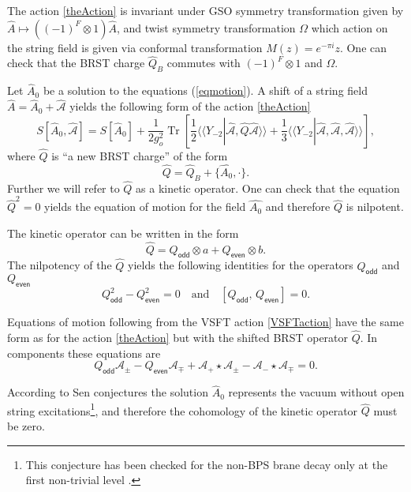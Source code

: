 \documentclass[a4paper,12pt]{article}
\newcommand{\ra}{\rightarrow}
\newcommand{\Ac}{\mathcal{A}}
\newcommand{\Tr}{\mathop{\mathrm{Tr}}\nolimits}
\newcommand{\la}{\langle\!\langle}
\renewcommand{\ra}{\rangle\!\rangle}
\begin{document}
The action \eqref{theAction} is invariant under GSO symmetry transformation given by
$\hat{A}\mapsto ((-1)^F\otimes 1)\hat{A}$,
and twist symmetry transformation $\Omega$ which action on the string field
is given via conformal transformation $M(z)=e^{-\pi i}z$.
One can check that the BRST charge $\hat{Q}_B$ commutes with $(-1)^F\otimes 1$
and $\Omega$.

Let $\hat{A}_{0}$ be a solution to the equations (\ref{eqmotion}).
A shift of a string field $
\hat{A}=\hat{A}_0+\hat{\Ac}
$ yields the following form of the action
\eqref{theAction}
\begin{equation}
S[\hat{A}_0,\hat{\Ac}]=S[\hat{A}_0]+\frac{1}{2g_o^2}\Tr\left[\frac{1}{2}\la Y_{-2}|\hat{\Ac}, \hat{Q}\hat{\Ac}\ra
+\frac13\la Y_{-2}|\hat{\Ac},\hat{\Ac}, \hat{\Ac}\ra\right],
\label{VSFTaction}
\end{equation}
where $\hat{Q}$ is ``a new BRST charge'' of the form
\begin{equation}
\hat{Q}=\hat{Q}_B+\{\hat{A_0},\cdot\}.
\label{shift:BRST}
\end{equation}
Further we will refer to $\hat{Q}$ as a kinetic operator.
One can check that the equation $\hat{Q}^2=0$
yields the equation of motion for the field $\hat{A_{0}}$ and
therefore $\hat{Q}$ is nilpotent.

The kinetic operator can be written in the form
\begin{equation}
\hat{Q}=Q_{\textsf{odd}}\otimes a+Q_{\textsf{even}}\otimes b.
\label{abg:100}
\end{equation}
The nilpotency of the $\hat{Q}$
yields the following identities for the operators $Q_{\textsf{odd}}$
and $Q_{\textsf{even}}$
\begin{equation}
Q_{\textsf{odd}}^2-Q_{\textsf{even}}^2=0\quad\text{and}\quad
[Q_{\textsf{odd}},\,Q_{\textsf{even}}]=0.
\label{eqBRST}
\end{equation}

Equations of motion following from the VSFT action \eqref{VSFTaction}
have the same form as for the action \eqref{theAction} but with the shifted BRST operator $\hat{Q}$.
In components these equations are
\begin{equation}
Q_{\textsf{odd}}\Ac_{\pm}-Q_{\textsf{even}}\Ac_{\mp}+\Ac_+\star \Ac_{\pm}
-\Ac_-\star \Ac_{\mp}=0.
\label{eqmotion-cal'}
\end{equation}


According to Sen conjectures \cite{sen-con} the solution $\hat{A}_0$
represents the
vacuum without open string excitations\footnote{This conjecture has been checked
for the non-BPS brane decay only at the first non-trivial
level {\cite{ABGKM}}.}, and therefore the cohomology of the kinetic
operator $\hat{Q}$ must be zero.
\end{document}
